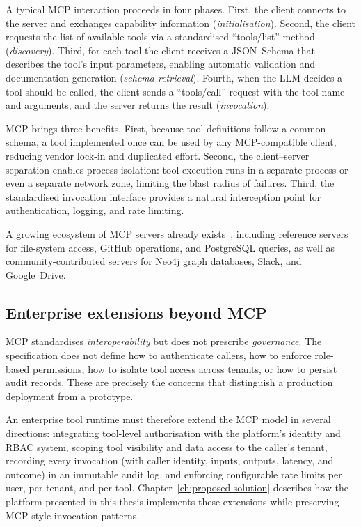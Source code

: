 \documentclass[a4paper,noexaminfo]{sapthesis}
\begin{document}
A typical MCP interaction proceeds in four phases.  First, the client
connects to the server and exchanges capability information
(\emph{initialisation}).  Second, the client requests the list of
available tools via a standardised ``tools/list'' method
(\emph{discovery}).  Third, for each tool the client receives a JSON~Schema
that describes the tool's input parameters, enabling automatic validation
and documentation generation (\emph{schema retrieval}).  Fourth, when the
LLM decides a tool should be called, the client sends a ``tools/call''
request with the tool name and arguments, and the server returns the
result (\emph{invocation}).

MCP brings three benefits.  First, because tool definitions follow a common
schema, a tool implemented once can be used by any MCP-compatible client,
reducing vendor lock-in and duplicated effort.  Second, the
client--server separation enables process isolation: tool execution runs in
a separate process or even a separate network zone, limiting the blast
radius of failures.  Third, the standardised invocation interface provides
a natural interception point for authentication, logging, and rate
limiting.

A growing ecosystem of MCP servers already
exists~\cite{mcpservers2024}, including reference servers for file-system
access, GitHub operations, and PostgreSQL queries, as well as
community-contributed servers for Neo4j graph databases, Slack, and
Google~Drive.

\subsection{Enterprise extensions beyond MCP}

MCP standardises \emph{interoperability} but does not prescribe
\emph{governance}.  The specification does not define how to authenticate
callers, how to enforce role-based permissions, how to isolate tool access
across tenants, or how to persist audit records.  These are precisely the
concerns that distinguish a production deployment from a prototype.

An enterprise tool runtime must therefore extend the MCP model in several
directions: integrating tool-level authorisation with the platform's
identity and RBAC system, scoping tool visibility and data access to the
caller's tenant, recording every invocation (with caller identity, inputs,
outputs, latency, and outcome) in an immutable audit log, and enforcing
configurable rate limits per user, per tenant, and per tool.
Chapter~\ref{ch:proposed-solution} describes how the platform presented in
this thesis implements these extensions while preserving MCP-style
invocation patterns.
\end{document}
